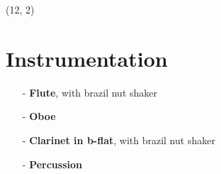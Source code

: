 \documentclass[11pt]{article}
\begin{document}
\begin{textblock}{11} (12, 2)

\section{Instrumentation}

\begin{itemize}

    \item[-] \textbf{Flute}, with brazil nut shaker \\

    \item[-] \textbf{Oboe} \\

    \item[-] \textbf{Clarinet in b-flat}, with brazil nut shaker \\

    \item[-] \textbf{Percussion} \\


\end{itemize}
\end{textblock}
\end{document}
